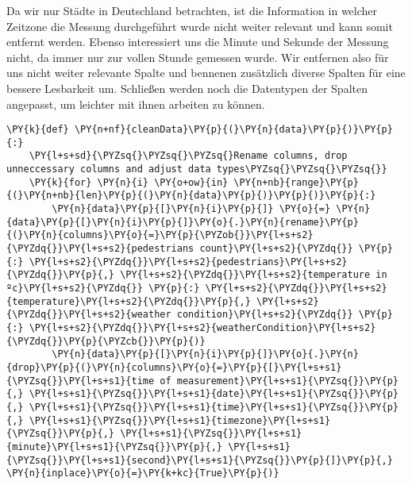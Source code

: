     Da wir nur Städte in Deutschland betrachten, ist die Information in
welcher Zeitzone die Messung durchgeführt wurde nicht weiter relevant
und kann somit entfernt werden. Ebenso interessiert uns die Minute und
Sekunde der Messung nicht, da immer nur zur vollen Stunde gemessen
wurde. Wir entfernen also für uns nicht weiter relevante Spalte und
bennenen zusätzlich diverse Spalten für eine bessere Lesbarkeit um.
Schließen werden noch die Datentypen der Spalten angepasst, um leichter
mit ihnen arbeiten zu können.

    \begin{tcolorbox}[breakable, size=fbox, boxrule=1pt, pad at break*=1mm,colback=cellbackground, colframe=cellborder]
\begin{Verbatim}[commandchars=\\\{\}]
\PY{k}{def} \PY{n+nf}{cleanData}\PY{p}{(}\PY{n}{data}\PY{p}{)}\PY{p}{:}
    \PY{l+s+sd}{\PYZsq{}\PYZsq{}\PYZsq{}Rename columns, drop unneccessary columns and adjust data types\PYZsq{}\PYZsq{}\PYZsq{}}
    \PY{k}{for} \PY{n}{i} \PY{o+ow}{in} \PY{n+nb}{range}\PY{p}{(}\PY{n+nb}{len}\PY{p}{(}\PY{n}{data}\PY{p}{)}\PY{p}{)}\PY{p}{:}
        \PY{n}{data}\PY{p}{[}\PY{n}{i}\PY{p}{]} \PY{o}{=} \PY{n}{data}\PY{p}{[}\PY{n}{i}\PY{p}{]}\PY{o}{.}\PY{n}{rename}\PY{p}{(}\PY{n}{columns}\PY{o}{=}\PY{p}{\PYZob{}}\PY{l+s+s2}{\PYZdq{}}\PY{l+s+s2}{pedestrians count}\PY{l+s+s2}{\PYZdq{}} \PY{p}{:} \PY{l+s+s2}{\PYZdq{}}\PY{l+s+s2}{pedestrians}\PY{l+s+s2}{\PYZdq{}}\PY{p}{,} \PY{l+s+s2}{\PYZdq{}}\PY{l+s+s2}{temperature in ºc}\PY{l+s+s2}{\PYZdq{}} \PY{p}{:} \PY{l+s+s2}{\PYZdq{}}\PY{l+s+s2}{temperature}\PY{l+s+s2}{\PYZdq{}}\PY{p}{,} \PY{l+s+s2}{\PYZdq{}}\PY{l+s+s2}{weather condition}\PY{l+s+s2}{\PYZdq{}} \PY{p}{:} \PY{l+s+s2}{\PYZdq{}}\PY{l+s+s2}{weatherCondition}\PY{l+s+s2}{\PYZdq{}}\PY{p}{\PYZcb{}}\PY{p}{)}
        \PY{n}{data}\PY{p}{[}\PY{n}{i}\PY{p}{]}\PY{o}{.}\PY{n}{drop}\PY{p}{(}\PY{n}{columns}\PY{o}{=}\PY{p}{[}\PY{l+s+s1}{\PYZsq{}}\PY{l+s+s1}{time of measurement}\PY{l+s+s1}{\PYZsq{}}\PY{p}{,} \PY{l+s+s1}{\PYZsq{}}\PY{l+s+s1}{date}\PY{l+s+s1}{\PYZsq{}}\PY{p}{,} \PY{l+s+s1}{\PYZsq{}}\PY{l+s+s1}{time}\PY{l+s+s1}{\PYZsq{}}\PY{p}{,} \PY{l+s+s1}{\PYZsq{}}\PY{l+s+s1}{timezone}\PY{l+s+s1}{\PYZsq{}}\PY{p}{,} \PY{l+s+s1}{\PYZsq{}}\PY{l+s+s1}{minute}\PY{l+s+s1}{\PYZsq{}}\PY{p}{,} \PY{l+s+s1}{\PYZsq{}}\PY{l+s+s1}{second}\PY{l+s+s1}{\PYZsq{}}\PY{p}{]}\PY{p}{,} \PY{n}{inplace}\PY{o}{=}\PY{k+kc}{True}\PY{p}{)}

\end{Verbatim}
\end{tcolorbox}
